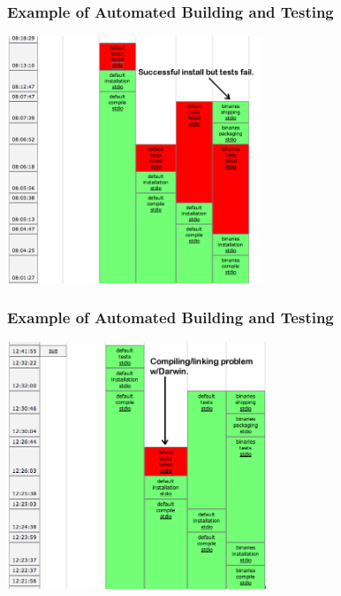\documentclass{beamer}
\begin{document}
\begin{frame}
  \frametitle{Example of Automated Building and Testing}

  \begin{center}
    \includegraphics[height=2.9in]{figs/buildbotfail}
  \end{center}

\end{frame}


\begin{frame}
  \frametitle{Example of Automated Building and Testing}

  \begin{center}
    \includegraphics[height=2.9in]{figs/buildbotsuccess}
  \end{center}

\end{frame}


\end{document}
